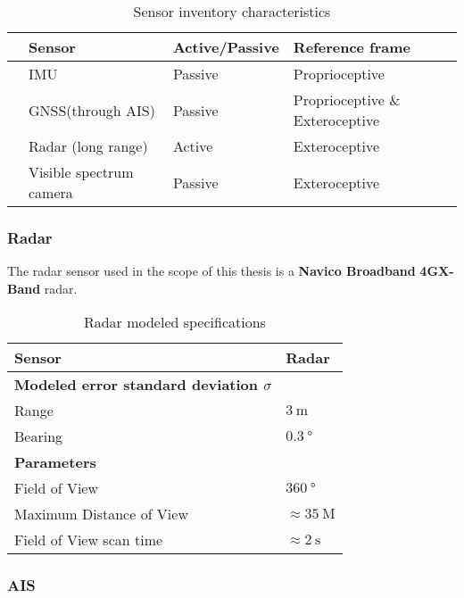 \begin{table}[H]
		\centering
	\caption{Sensor inventory characteristics}
	\label{tab:sensor_active}
	\begin{tabular}{llll}
		\hline
		& \textbf{Sensor}         & \textbf{Active/Passive} & \textbf{Reference frame} \T \\ \hline
		& IMU                     & Passive                 & Proprioceptive                       \T \\ 
		& GNSS(through AIS)       & Passive                 & Proprioceptive \& Exteroceptive \\
		& Radar (long range)      & Active                  & Exteroceptive                         \\ 
		& Visible spectrum camera & Passive                 & Exteroceptive                         \\ \hline
	\end{tabular}
\end{table}

\subsubsection{Radar}
The radar sensor used in the scope of this thesis is a \textbf{Navico Broadband}  \textbf{4G\tm X-Band} radar.


\begin{table}[]
	\centering
	\caption{Radar modeled specifications}
	\label{tab:radar_specs}
	\begin{tabular}{ll}
		\hline
		\textbf{Sensor} & Radar \T \\ \hline
		\textbf{Modeled error standard deviation $\sigma$} & \T \\
		Range & $\SI{3}{\m}$ \\
		Bearing & $\SI{0.3}{\degree}$ \\ \hline
		\textbf{Parameters} & \T \\
		Field of View & $\SI{360}{\degree}$ \\
		Maximum Distance of View & $\approx \SI{35}{\nauticalmile}$ \\
		Field of View scan time & $\approx \SI{2}{\second}$ \\ \hline
	\end{tabular}
\end{table}
\subsubsection{AIS}

